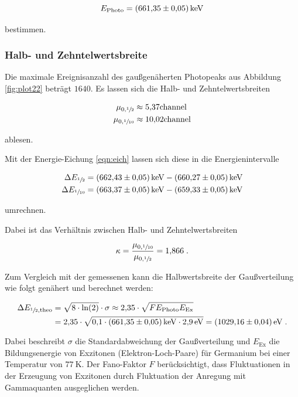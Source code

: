 \begin{equation*}
  E_\text{Photo} = \SI{661.35 +- 0.05}{\kilo\eV}
\end{equation*}

bestimmen.

\subsubsection{Halb- und Zehntelwertsbreite}

Die maximale Ereignisanzahl des gaußgenäherten Photopeaks aus Abbildung \ref{fig:plot22} beträgt $\num{1640}$.
Es lassen sich die Halb- und Zehntelwertsbreiten 

\begin{align*}
  \mu_{0, \sfrac{1}{2}} &\approx \num{5.37}\text{channel} \\
  \mu_{0, \sfrac{1}{10}} &\approx \num{10.02}\text{channel}
\end{align*} 

ablesen.

Mit der Energie-Eichung \eqref{eqn:eich} lassen sich diese in die Energienintervalle

\begin{align*}
  \Delta E_{\sfrac{1}{2}}  &= \SI{662.43 +- 0.05}{\kilo\eV} - \SI{660.27 +- 0.05}{\kilo\eV} \\
  \Delta E_{\sfrac{1}{10}} &= \SI{663.37 +- 0.05}{\kilo\eV} - \SI{659.33 +- 0.05}{\kilo\eV}
\end{align*}

umrechnen.

Dabei ist das Verhältnis zwischen Halb- und Zehntelwertsbreiten

\begin{equation}
  \kappa = \frac{\mu_{0, \sfrac{1}{10}}}{\mu_{0, \sfrac{1}{2}}} = \num{1.866}\; .
\end{equation}

Zum Vergleich mit der gemessenen kann die Halbwertsbreite der Gaußverteilung wie folgt genähert und berechnet werden:

\begin{align}
  \Delta E_{\sfrac{1}{2}, \text{theo}} &= \sqrt{8 \cdot \text{ln}(2)} \cdot \sigma \approx \num{2.35} \cdot \sqrt{F E_\text{Photo} E_\text{Ex}} \\
  &= \num{2.35} \cdot \sqrt{\num{0.1}\cdot \SI{661.35 +- 0.05}{\kilo\eV} \cdot \SI{2.9}{\eV}} = \SI{1029.16 +- 0.04}{\eV} \; .
\end{align}

Dabei beschreibt $\sigma$ die Standardabweichung der Gaußverteilung und $E_\text{Ex}$ die
Bildungsenergie von Exzitonen (Elektron-Loch-Paare) für Germanium bei einer Temperatur von $\SI{77}{\kelvin}$. 
Der Fano-Faktor $F$ berücksichtigt, dass Fluktuationen in der Erzeugung von Exzitonen
durch Fluktuation der Anregung mit Gammaquanten ausgeglichen werden.

